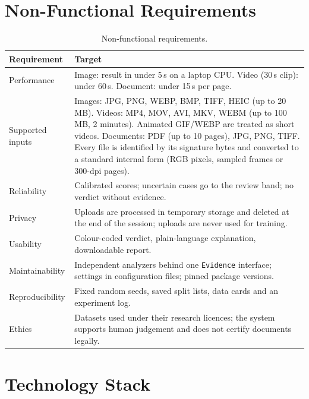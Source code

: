 \documentclass[11pt,a4paper]{article}
\begin{document}
\section{Non-Functional Requirements}
\label{sec:nfr}

\begin{table}[htbp]
\centering
\small
\begin{tabularx}{\linewidth}{@{}l Y@{}}
\toprule
\textbf{Requirement} & \textbf{Target} \\
\midrule
Performance & Image: result in under 5\,s on a laptop CPU. Video (30\,s clip): under 60\,s. Document: under 15\,s per page. \\
Supported inputs & Images: JPG, PNG, WEBP, BMP, TIFF, HEIC (up to 20\,MB). Videos: MP4, MOV, AVI, MKV, WEBM (up to 100\,MB, 2 minutes). Animated GIF/WEBP are treated as short videos. Documents: PDF (up to 10 pages), JPG, PNG, TIFF. Every file is identified by its signature bytes and converted to a standard internal form (RGB pixels, sampled frames or 300-dpi pages). \\
Reliability & Calibrated scores; uncertain cases go to the review band; no verdict without evidence. \\
Privacy & Uploads are processed in temporary storage and deleted at the end of the session; uploads are never used for training. \\
Usability & Colour-coded verdict, plain-language explanation, downloadable report. \\
Maintainability & Independent analyzers behind one \texttt{Evidence} interface; settings in configuration files; pinned package versions. \\
Reproducibility & Fixed random seeds, saved split lists, data cards and an experiment log. \\
Ethics & Datasets used under their research licences; the system supports human judgement and does not certify documents legally. \\
\bottomrule
\end{tabularx}
\caption{Non-functional requirements.}
\label{tab:nfr}
\end{table}

\section{Technology Stack}
\label{sec:stack}
\end{document}
